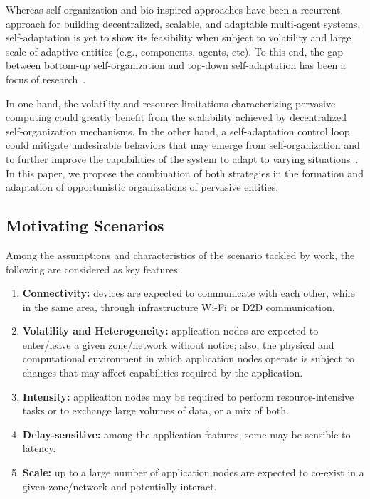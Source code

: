 Whereas self-organization and bio-inspired approaches have been a recurrent approach for building decentralized, scalable, and adaptable multi-agent systems, self-adaptation is yet to show its feasibility when subject to volatility and large scale of adaptive entities (e.g., components, agents, etc). To this end, the gap between bottom-up self-organization and top-down self-adaptation has been a focus of research~\cite{Kramer:, Zambonelli:, Weyns:}. 

In one hand, the volatility and resource limitations characterizing pervasive computing could greatly benefit from the scalability achieved by decentralized self-organization mechanisms. In the other hand, a self-adaptation control loop could mitigate undesirable behaviors that may emerge from self-organization and to further improve the capabilities of the system to adapt to varying situations~\cite{Zambonelli:}. In this paper, we propose the combination of both strategies in the formation and adaptation of opportunistic organizations of pervasive entities.


\subsection{Motivating Scenarios}\label{sec:motivating}

Among the assumptions and characteristics of the scenario tackled by work, the following are considered as key features:

\begin{enumerate}[label=C\arabic*]
	
	\item \textbf{Connectivity:} devices are expected to communicate with each other, while in the same area, through infrastructure Wi-Fi or D2D communication.
	
	\item \textbf{Volatility and Heterogeneity:} application nodes are expected to enter/leave a given zone/network without notice; also, the physical and computational environment in which application nodes operate is subject to changes that may affect capabilities required by the application.
	
	\item \textbf{Intensity:} application nodes may be required to perform resource-intensive tasks or to exchange large volumes of data, or a mix of both.
	
	\item \textbf{Delay-sensitive:} among the application features, some may be sensible to latency.
	
	\item \textbf{Scale:} up to a large number of application nodes are expected to co-exist in a given zone/network and potentially interact.

	
\end{enumerate}

